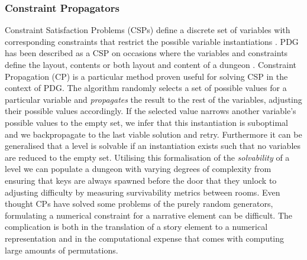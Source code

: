 \documentclass{UoYCSproject}
\begin{document}
\subsubsection{Constraint Propagators}
Constraint Satisfaction Problems (CSPs) define a discrete set of variables with corresponding constraints that restrict the possible variable instantiations \parencite{kumar1992CPalgorithms}. PDG has been described as a CSP on occasions where the variables and constraints define the layout, contents or both layout and content of a dungeon \parencite{HorswillCSPMission, GreenCSPboth}. Constraint Propagation (CP) is a particular method proven useful for solving CSP in the context of PDG. The algorithm randomly selects a set of possible values for a particular variable and \textit{propagates} the result to the rest of the variables, adjusting their possible values accordingly. If the selected value narrows another variable's possible values to the empty set, we infer that this instantiation is suboptimal and we backpropagate to the last viable solution and retry. Furthermore it can be generalised that a level is solvable if an instantiation exists such that no variables are reduced to the empty set. Utilising this formalisation of the \textit{solvability} of a level we can populate a dungeon with varying degrees of complexity from ensuring that keys are always spawned before the door that they unlock to adjusting difficulty by measuring survivability metrics between rooms. Even thought CPs have solved some problems of the purely random generators, formulating a numerical constraint for a narrative element can be difficult. The complication is both in the translation of a story element to a numerical representation and in the computational expense that comes with computing large amounts of permutations.
\end{document}
